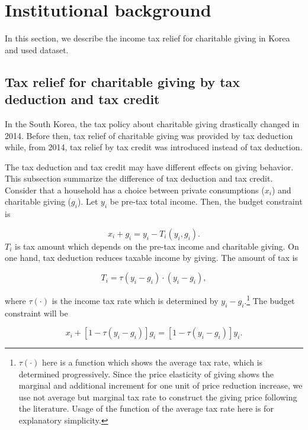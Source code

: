 \documentclass[ review  , 3p ]{elsarticle}
\begin{document}
  \hypertarget{institutional-background}{%
  \section{Institutional background}\label{institutional-background}}

  In this section, we describe the income tax relief for charitable giving in Korea and used dataset.

  \hypertarget{tax-relief-for-charitable-giving-by-tax-deduction-and-tax-credit}{%
  \subsection{Tax relief for charitable giving by tax deduction and tax credit}\label{tax-relief-for-charitable-giving-by-tax-deduction-and-tax-credit}}

  In the South Korea, the tax policy about charitable giving drastically changed in 2014. Before then, tax relief of charitable giving was provided by tax deduction while, from 2014, tax relief by tax credit was introduced instead of tax deduction.

  The tax deduction and tax credit may have different effects on giving behavior. This subsection summarize the difference of tax deduction and tax credit.
  Consider that a household has a choice between private consumptions (\(x_i\)) and charitable giving (\(g_i\)). Let \(y_i\) be pre-tax total income.
  Then, the budget constraint is

  \[
      x_i + g_i = y_i - T_i(y_i, g_i).
  \]
  \(T_i\) is tax amount which depends on the pre-tax income and charitable giving.
  On one hand, tax deduction reduces taxable income by giving. The amount of tax is

  \[
      T_i = \tau(y_i - g_i) \cdot (y_i - g_i),
  \]

  where \(\tau(\cdot)\) is the income tax rate which is determined by \(y_i - g_i\).\footnote{\(\tau(\cdot)\) here is a function which shows the average tax rate, which is determined progressively. Since the price elasticity of giving shows the marginal and additional increment for one unit of price reduction increase, we use not average but marginal tax rate to construct the giving price following the literature. Usage of the function of the average tax rate here is for explanatory simplicity.} The budget constraint will be

  \[
      x_i + [1 - \tau(y_i - g_i)]g_i = [1 - \tau(y_i - g_i)] y_i.
  \]
\end{document}
